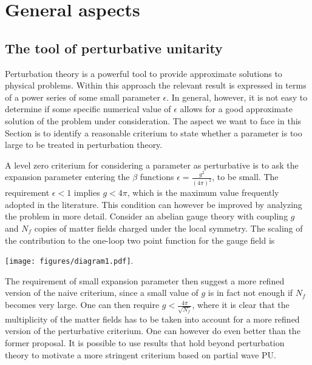 \documentclass[a4paper,11pt]{article}
\begin{document}


\section{General aspects}

\subsection{The tool of perturbative unitarity}\label{sec:pu}


Perturbation theory is a powerful tool to provide approximate solutions to physical problems. Within this approach the relevant result is expressed in terms of a power series of some small parameter $\epsilon$. In general, however, it is not easy to determine if some specific numerical value of $\epsilon$ allows for a good approximate solution of the problem under consideration. The aspect we want to face in this Section is to identify a reasonable criterium to state whether a parameter is too large to be treated in perturbation theory.

A level zero criterium for considering a parameter as perturbative is to ask  the expansion parameter entering the $\beta$ functions $\epsilon=\frac{g^2}{(4\pi)^2}$, to be small. The requirement $\epsilon<1$ implies $g<4\pi$, which is the maximum value frequently adopted in the literature.
This condition can however be improved by analyzing the problem in more detail. Consider an abelian gauge theory with coupling $g$ and $N_f$ copies of matter fields charged under the local symmetry. The  scaling of the contribution to the one-loop two point function for the gauge field is
\begin{center}
\texttt{[image: figures/diagram1.pdf]}.
\end{center}
The requirement of small expansion parameter then suggest a more refined version of the naive criterium, since a small value of $g$ is in fact not enough if $N_f$ becomes very large. One can then require $g < \frac{4 \pi}{\sqrt{N_f}}$, where it is clear that the multiplicity of the matter fields has to be taken into account for a more refined version of the perturbative criterium. One can however do even better than the former proposal. It is possible to use results that hold beyond perturbation theory to motivate a more stringent criterium based on partial wave PU. 
\end{document}
